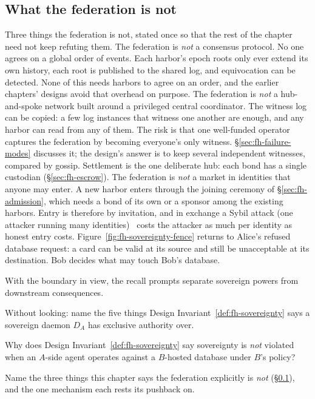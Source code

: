 \documentclass[11pt,a4paper]{article}
\theoremstyle{definition}
\theoremstyle{remark}
\begin{document}
\subsection{What the federation is not}\label{sec:fh-not}
Three things the federation is not, stated once so that the rest of the chapter need not keep refuting them.
The federation is \emph{not} a consensus protocol. No one agrees on a global order of events. Each harbor's epoch roots only ever extend its own history, each root is published to the shared log, and equivocation can be detected. None of this needs harbors to agree on an order, and the earlier chapters' designs avoid that overhead on purpose.
The federation is \emph{not} a hub-and-spoke network built around a privileged central coordinator. The witness log can be copied: a few log instances that witness one another are enough, and any harbor can read from any of them. The risk is that one well-funded operator captures the federation by becoming everyone's only witness. \S\ref{sec:fh-failure-modes} discusses it; the design's answer is to keep several independent witnesses, compared by gossip. Settlement is the one deliberate hub: each bond has a single custodian (\S\ref{sec:fh-escrow}).
The federation is \emph{not} a market in identities that anyone may enter. A new harbor enters through the joining ceremony of \S\ref{sec:fh-admission}, which needs a bond of its own or a sponsor among the existing harbors. Entry is therefore by invitation, and in exchange a Sybil attack (one attacker running many identities)~ costs the attacker as much per identity as honest entry costs.
Figure~\ref{fig:fh-sovereignty-fence} returns to Alice's refused database
request: a card can be valid at its source and still be unacceptable at its
destination. Bob decides what may touch Bob's database.

With the boundary in view, the recall prompts separate sovereign powers from downstream consequences.
\begin{pdrecitationbody}
\item Without looking: name the five things Design Invariant~\ref{def:fh-sovereignty} says a sovereign daemon $D_A$ has exclusive authority over.
\item Why does Design Invariant~\ref{def:fh-sovereignty} say sovereignty is \emph{not} violated when an $A$-side agent operates against a $B$-hosted database under $B$'s policy?
\item Name the three things this chapter says the federation explicitly is \emph{not} (\S\ref{sec:fh-not}), and the one mechanism each rests its pushback on.
\end{pdrecitationbody}
\end{document}
